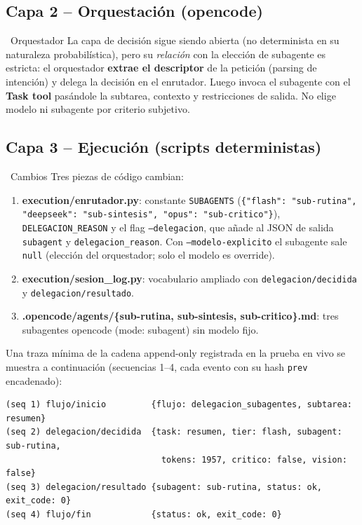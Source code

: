 \documentclass[11pt,a4paper]{article}
\newcommand{\iconotexto}[2]{\textcolor{cyanNeon}{\faIcon{#1}}~#2}
\begin{document}
\subsection{Capa 2 -- Orquestación (opencode)}

\iconotexto{cogs}{Orquestador} La capa de decisión sigue siendo abierta (no determinista
en su naturaleza probabilística), pero su \emph{relación} con la elección de subagente es
estricta: el orquestador \textbf{extrae el descriptor} de la petición (parsing de
intención) y delega la decisión en el enrutador. Luego invoca el subagente con el
\textbf{Task tool} pasándole la subtarea, contexto y restricciones de salida. No elige
modelo ni subagente por criterio subjetivo.

\subsection{Capa 3 -- Ejecución (scripts deterministas)}

\iconotexto{code}{Cambios} Tres piezas de código cambian:

\begin{enumerate}[leftmargin=20pt, itemsep=3pt, topsep=2pt]
  \item \textbf{execution/enrutador.py}: constante \texttt{SUBAGENTS}
        (\texttt{\{"flash": "sub-rutina", "deepseek": "sub-sintesis", "opus":
        "sub-critico"\}}), \texttt{DELEGACION\_REASON} y el flag \texttt{--delegacion},
        que añade al JSON de salida \texttt{subagent} y \texttt{delegacion\_reason}.
        Con \texttt{--modelo-explicito} el subagente sale \texttt{null} (elección del
        orquestador; solo el modelo es override).
  \item \textbf{execution/sesion\_log.py}: vocabulario ampliado con
        \texttt{delegacion/decidida} y \texttt{delegacion/resultado}.
  \item \textbf{.opencode/agents/\{sub-rutina, sub-sintesis, sub-critico\}.md}: tres
        subagentes opencode (mode: subagent) sin modelo fijo.
\end{enumerate}

Una traza mínima de la cadena append-only registrada en la prueba en vivo se muestra a
continuación (secuencias 1--4, cada evento con su hash \texttt{prev} encadenado):

\begin{lstlisting}
(seq 1) flujo/inicio         {flujo: delegacion_subagentes, subtarea: resumen}
(seq 2) delegacion/decidida  {task: resumen, tier: flash, subagent: sub-rutina,
                               tokens: 1957, critico: false, vision: false}
(seq 3) delegacion/resultado {subagent: sub-rutina, status: ok, exit_code: 0}
(seq 4) flujo/fin            {status: ok, exit_code: 0}
\end{lstlisting}
\end{document}

